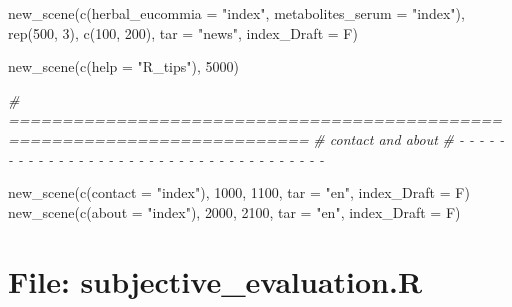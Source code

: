 \documentclass[
]{article}
\newenvironment{Shaded}{\begin{snugshade}}{\end{snugshade}}
\newcommand{\AttributeTok}[1]{\textcolor[rgb]{0.77,0.63,0.00}{#1}}
\newcommand{\CommentTok}[1]{\textcolor[rgb]{0.56,0.35,0.01}{\textit{#1}}}
\newcommand{\DecValTok}[1]{\textcolor[rgb]{0.00,0.00,0.81}{#1}}
\newcommand{\FunctionTok}[1]{\textcolor[rgb]{0.00,0.00,0.00}{#1}}
\newcommand{\NormalTok}[1]{#1}
\newcommand{\StringTok}[1]{\textcolor[rgb]{0.31,0.60,0.02}{#1}}
\begin{document}
\begin{Shaded}
\begin{Highlighting}[]
\FunctionTok{new\_scene}\NormalTok{(}\FunctionTok{c}\NormalTok{(}\AttributeTok{herbal\_eucommia =} \StringTok{"index"}\NormalTok{,}
            \AttributeTok{metabolites\_serum =} \StringTok{"index"}\NormalTok{),}
          \FunctionTok{rep}\NormalTok{(}\DecValTok{500}\NormalTok{, }\DecValTok{3}\NormalTok{), }\FunctionTok{c}\NormalTok{(}\DecValTok{100}\NormalTok{, }\DecValTok{200}\NormalTok{), }\AttributeTok{tar =} \StringTok{"news"}\NormalTok{, }\AttributeTok{index\_Draft =}\NormalTok{ F)}

\FunctionTok{new\_scene}\NormalTok{(}\FunctionTok{c}\NormalTok{(}\AttributeTok{help =} \StringTok{"R\_tips"}\NormalTok{), }\DecValTok{5000}\NormalTok{)}
\end{Highlighting}
\end{Shaded}

\begin{Shaded}
\begin{Highlighting}[]
\CommentTok{\# ==========================================================================}
\CommentTok{\# contact and about}
\CommentTok{\# {-} {-} {-} {-} {-} {-} {-} {-} {-} {-} {-} {-} {-} {-} {-} {-} {-} {-} {-} {-} {-} {-} {-} {-} {-} {-} {-} {-} {-} {-} {-} {-} {-} {-} {-} {-} {-}}

\FunctionTok{new\_scene}\NormalTok{(}\FunctionTok{c}\NormalTok{(}\AttributeTok{contact =} \StringTok{"index"}\NormalTok{), }\DecValTok{1000}\NormalTok{, }\DecValTok{1100}\NormalTok{, }\AttributeTok{tar =} \StringTok{"en"}\NormalTok{, }\AttributeTok{index\_Draft =}\NormalTok{ F)}
\FunctionTok{new\_scene}\NormalTok{(}\FunctionTok{c}\NormalTok{(}\AttributeTok{about =} \StringTok{"index"}\NormalTok{), }\DecValTok{2000}\NormalTok{, }\DecValTok{2100}\NormalTok{, }\AttributeTok{tar =} \StringTok{"en"}\NormalTok{, }\AttributeTok{index\_Draft =}\NormalTok{ F)}
\end{Highlighting}
\end{Shaded}

\hypertarget{file-subjective_evaluation.r}{%
\section{File: subjective\_evaluation.R}\label{file-subjective_evaluation.r}}
\end{document}
